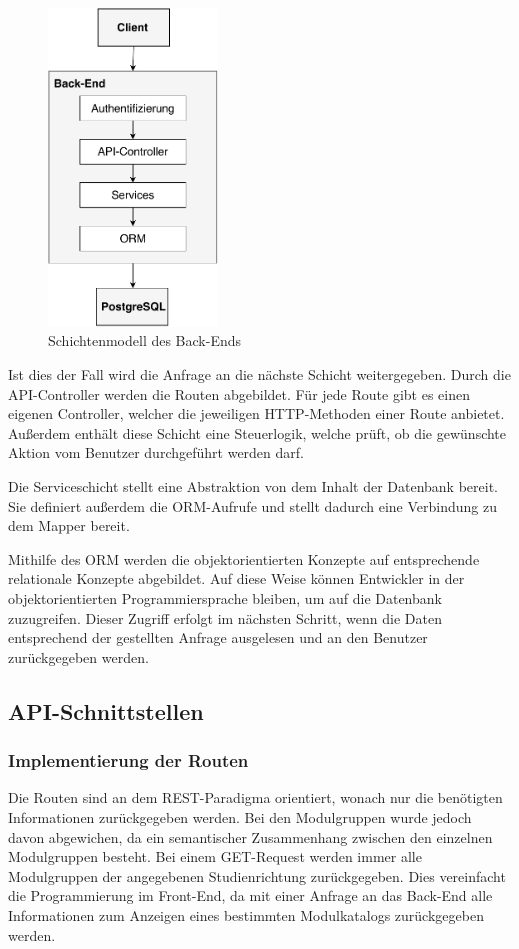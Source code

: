 \begin{figure}[h]
	\centering 
	\includegraphics[width=0.4\textwidth]{img/SchichtenmodellBackend.pdf}
	\captionsetup{format=hang}
	\caption[Schichtenmodell des Back-Ends]{\label{fig:Schichtenmodell}Schichtenmodell des Back-Ends}
\end{figure}

Ist dies der Fall wird die Anfrage an die nächste Schicht weitergegeben.
Durch die \ac{API}-Controller werden die Routen abgebildet.
Für jede Route gibt es einen eigenen Controller, welcher die jeweiligen \acs{HTTP}-Methoden einer Route anbietet.
Außerdem enthält diese Schicht eine Steuerlogik, welche prüft, ob die gewünschte Aktion vom Benutzer durchgeführt werden darf. 

Die Serviceschicht stellt eine Abstraktion von dem Inhalt der Datenbank bereit.
Sie definiert außerdem die \ac{ORM}-Aufrufe und stellt dadurch eine Verbindung zu dem Mapper bereit. 

Mithilfe des \ac{ORM} werden die objektorientierten Konzepte auf entsprechende relationale Konzepte abgebildet.
Auf diese Weise können Entwickler in der objektorientierten Programmiersprache bleiben, um auf die Datenbank zuzugreifen.
Dieser Zugriff erfolgt im nächsten Schritt, wenn die Daten entsprechend der gestellten Anfrage ausgelesen und an den Benutzer zurückgegeben werden. 

\subsection{API-Schnittstellen}
\subsubsection{Implementierung der Routen}
Die Routen sind an dem \ac{REST}-Paradigma orientiert, wonach nur die benötigten Informationen zurückgegeben werden.
Bei den Modulgruppen wurde jedoch davon abgewichen, da ein semantischer Zusammenhang zwischen den einzelnen Modulgruppen besteht.
Bei einem GET-Request werden immer alle Modulgruppen der angegebenen Studienrichtung zurückgegeben.
Dies vereinfacht die Programmierung im Front-End, da mit einer Anfrage an das Back-End alle Informationen zum Anzeigen eines bestimmten Modulkatalogs zurückgegeben werden.

